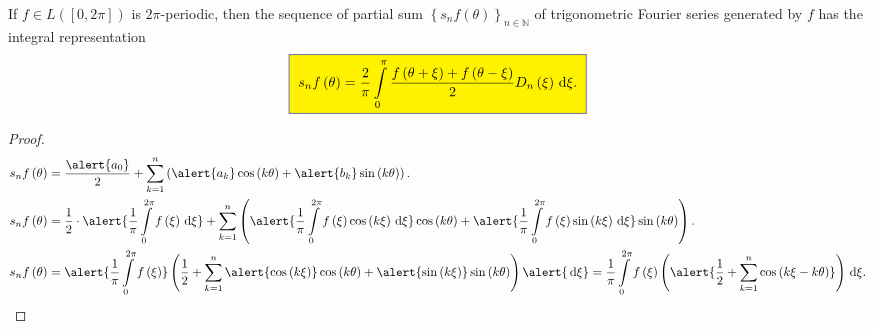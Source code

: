 \begin{frame}[allowframebreaks]
	\begin{lemma}
		If $f\in L\left(\left[0,2\pi\right]\right)$ is $2\pi$-periodic,
		then the sequence of partial sum
		$\left\{s_{n}f\left(\theta\right)\right\}_{n\in\mathds{N}}$ of
		trigonometric Fourier series generated by $f$ has the integral
		representation
		\begin{equation*}
			\fcolorbox{DarkBlue}{yellow}{
				\begin{math}
					\displaystyle
					s_{n}f\left(\theta\right)=
					\frac{2}{\pi}\int\limits_{0}^{\pi}
					\frac{f\left(\theta+\xi\right)+f\left(\theta-\xi\right)}{2}
					D_{n}\left(\xi\right)\dl\xi.
				\end{math}
			}
		\end{equation*}
	\end{lemma}

	\begin{proof}
		\begin{align*}
			s_{n}f\left(\theta\right) & =
			\frac{\alert{a_{0}}}{2}+
			\sum_{k=1}^{n}
			\left(
			\alert{a_{k}}\cos\left(k\theta\right)+
			\alert{b_{k}}\sin\left(k\theta\right)
			\right).                      \\
			s_{n}f\left(\theta\right) & =
			\frac{1}{2}\cdot
			\alert{
				\frac{1}{\pi}
				\int\limits_{0}^{2\pi}
				f\left(\xi\right){\dl\xi}
			}+
			\sum_{k=1}^{n}
			\left(
			\alert{
				\frac{1}{\pi}
				\int\limits_{0}^{2\pi}
				f\left(\xi\right)\cos\left(k\xi\right){\dl\xi}
			}
			\cos\left(k\theta\right)+
			\alert{
				\frac{1}{\pi}
				\int\limits_{0}^{2\pi}
				f\left(\xi\right)\sin\left(k\xi\right){\dl\xi}
			}
			\sin\left(k\theta\right)
			\right).                      \\
			s_{n}f\left(\theta\right) & =
			\alert{
				\frac{1}{\pi}
				\int\limits_{0}^{2\pi}
				f\left(\xi\right)
			}
			\left(
			\frac{1}{2}
			+
			\sum_{k=1}^{n}
			\alert{\cos\left(k\xi\right)}
			\cos\left(k\theta\right)+
			\alert{\sin\left(k\xi\right)}
			\sin\left(k\theta\right)
			\right)
			\alert{{\dl\xi}}=
			\frac{1}{\pi}
			\int\limits_{0}^{2\pi}
			f\left(\xi\right)
			\left(
			\alert{
				\frac{1}{2}
				+
				\sum_{k=1}^{n}
				\cos\left(k\xi-k\theta\right)
			}
			\right)\dl\xi.
		\end{align*}

		\framebreak


\end{proof}
\end{frame}

